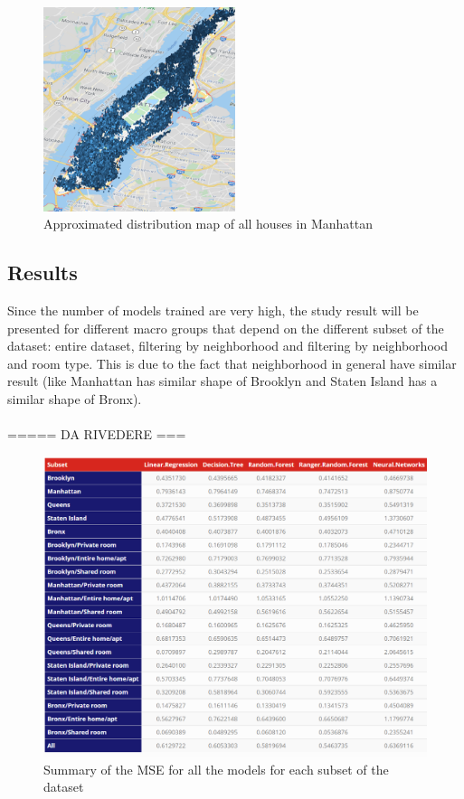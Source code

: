 \documentclass{FR16}
\begin{document}
\begin{figure}[H]
\centering
\includegraphics[width=0.5\textwidth]{figures/figure4.PNG} 
\caption{\label{fig:4}  Approximated distribution map of all houses in Manhattan }
\end{figure}



\subsection{Results}

Since the number of models trained are very high, the study result will be presented for different macro groups that depend on the different subset of the dataset: entire dataset,  filtering by neighborhood and filtering by neighborhood and room type. This is due to the fact that neighborhood in general have similar result (like Manhattan has similar shape of Brooklyn and Staten Island has a similar shape of Bronx).\\\\
 =====
 DA RIVEDERE
 ===\\
\begin{figure}[H]
\centering
\includegraphics[width=1\textwidth]{figures/model_summary.PNG} 
\caption{\label{fig:5} Summary of the MSE for all the models for each subset of the dataset }
\end{figure}
\end{document}
